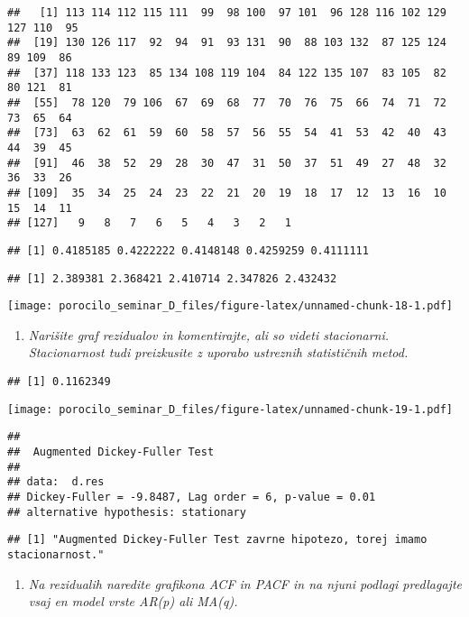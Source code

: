 \documentclass[
]{article}
\providecommand{\tightlist}{%
  \setlength{\itemsep}{0pt}\setlength{\parskip}{0pt}}
\begin{document}
\begin{verbatim}
##   [1] 113 114 112 115 111  99  98 100  97 101  96 128 116 102 129 127 110  95
##  [19] 130 126 117  92  94  91  93 131  90  88 103 132  87 125 124  89 109  86
##  [37] 118 133 123  85 134 108 119 104  84 122 135 107  83 105  82  80 121  81
##  [55]  78 120  79 106  67  69  68  77  70  76  75  66  74  71  72  73  65  64
##  [73]  63  62  61  59  60  58  57  56  55  54  41  53  42  40  43  44  39  45
##  [91]  46  38  52  29  28  30  47  31  50  37  51  49  27  48  32  36  33  26
## [109]  35  34  25  24  23  22  21  20  19  18  17  12  13  16  10  15  14  11
## [127]   9   8   7   6   5   4   3   2   1
\end{verbatim}

\begin{verbatim}
## [1] 0.4185185 0.4222222 0.4148148 0.4259259 0.4111111
\end{verbatim}

\begin{verbatim}
## [1] 2.389381 2.368421 2.410714 2.347826 2.432432
\end{verbatim}

\texttt{[image: porocilo\_seminar\_D\_files/figure-latex/unnamed-chunk-18-1.pdf]}

\begin{enumerate}
\def\labelenumi{\arabic{enumi}.}
\setcounter{enumi}{2}
\tightlist
\item
  \emph{Narišite graf rezidualov in komentirajte, ali so videti
  stacionarni. Stacionarnost tudi preizkusite z uporabo ustreznih
  statističnih metod.}
\end{enumerate}

\begin{verbatim}
## [1] 0.1162349
\end{verbatim}

\texttt{[image: porocilo\_seminar\_D\_files/figure-latex/unnamed-chunk-19-1.pdf]}

\begin{verbatim}
## 
##  Augmented Dickey-Fuller Test
## 
## data:  d.res
## Dickey-Fuller = -9.8487, Lag order = 6, p-value = 0.01
## alternative hypothesis: stationary
\end{verbatim}

\begin{verbatim}
## [1] "Augmented Dickey-Fuller Test zavrne hipotezo, torej imamo stacionarnost."
\end{verbatim}

\begin{enumerate}
\def\labelenumi{\arabic{enumi}.}
\setcounter{enumi}{3}
\tightlist
\item
  \emph{Na rezidualih naredite grafikona ACF in PACF in na njuni podlagi
  predlagajte vsaj en model vrste AR(p) ali MA(q).}
\end{enumerate}
\end{document}
